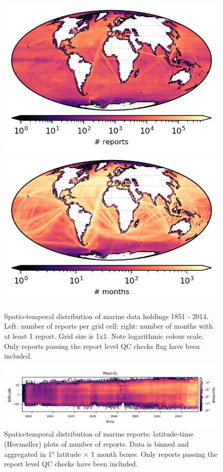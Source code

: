 \begin{figure} [h]
    \centering
    \includegraphics{resources/header-reports-map-optimal.png}
    \includegraphics{resources/header-months-map-optimal.png}
    \caption{Spatio-temporal distribution of marine data holdings 1851 - 2014. Left: number of reports per grid cell; right: number of months with at least 1 report. Grid size is 1x1. Note logarithmic colour scale. Only reports passing the report level QC checks flag have been included.}
    \label{fig:nreports-map}
\end{figure}

\begin{figure}
    \centering
    \includegraphics{resources/header-nreports_hovmoller_monthly}
    \caption{Spatio-temporal distribution of marine reports: latitude-time (Hovmøller) plots of number of reports. Data is binned and aggregated in 1° latitude × 1 month boxes. Only reports passing the report level QC checks have been included.}
    \label{fig:nreports-hovmoller}
\end{figure}

